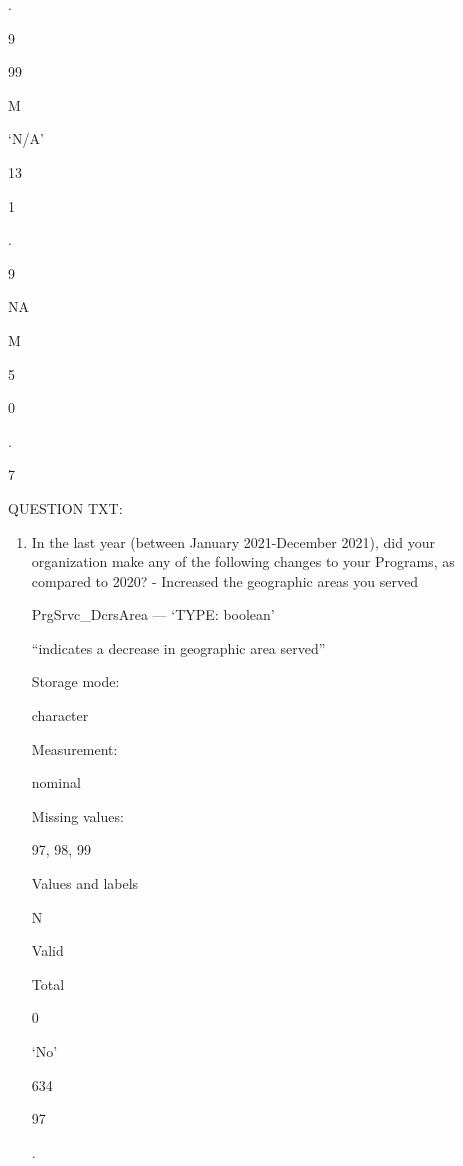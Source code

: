 \documentclass[
  letterpaper,
]{scrbook}
\providecommand{\tightlist}{%
  \setlength{\itemsep}{0pt}\setlength{\parskip}{0pt}}\usepackage{longtable,booktabs,array}
\begin{document}
\begin{enumerate}
\begin{enumerate}
\begin{enumerate}
\begin{enumerate}
\begin{enumerate}
\begin{enumerate}
\begin{enumerate}
              .

              9

              99

              M

              `N/A'

              13

              1

              .

              9

              NA

              M

              5

              0

              .

              7

              QUESTION TXT:

              \begin{enumerate}
              \def\labelenumviii{\arabic{enumviii}.}
              \tightlist
              \item
                In the last year (between January 2021-December 2021),
                did your organization make any of the following changes
                to your Programs, as compared to 2020? - Increased the
                geographic areas you served

                PrgSrvc\_DcrsArea --- {`TYPE: boolean'}

                ``indicates a decrease in geographic area served''

                Storage mode:

                character

                Measurement:

                nominal

                Missing values:

                97, 98, 99

                Values and labels

                N

                Valid

                Total

                0

                `No'

                634

                97

                .


\end{enumerate}
\end{enumerate}
\end{enumerate}
\end{enumerate}
\end{enumerate}
\end{enumerate}
\end{enumerate}
\end{enumerate}
\end{document}
